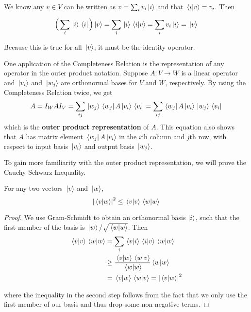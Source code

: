\begin{lproof}
We know any $v \in V$ can be written as $v = \sum_{i} v_{i} \ket*{i}$ and that $\bra*{i} \ket*{v} = v_{i}$. Then 

$$\Big( \sum_{i} \ket*{i} \bra*{i} \Big) \ket*{v} = \sum_{i} \ket*{i} \bra*{i} \ket*{v} = \sum_{i} v_{i} \ket*{i} = \ket*{v}$$

Because this is true for all $\ket*{v}$, it must be the identity operator. 
\end{lproof}

One application of the Completeness Relation is the representation of any operator in the outer product notation. Suppose $A: V \rightarrow W$ is a linear operator and $\ket*{v_{i}}$ and $\ket*{w_{j}}$ are orthonormal bases for $V$ and $W$, respectively. By using the Completeness Relation twice, we get
$$A = I_{W} A I_{V} = \sum_{ij} \ket*{w_{j}} \bra*{w_{j}} A \ket*{v_{i}} \bra*{v_{i}} = \sum_{ij} \bra*{w_{j}} A \ket*{v_{i}} \ket*{w_{j}} \bra*{v_{i}}$$
which is the \textbf{outer product representation} of $A$. This equation also shows that $A$ has matrix element $\bra*{w_{j}}A\ket*{v_{i}}$ in the $i$th column and $j$th row, with respect to input basis $\ket*{v_{i}}$ and output basis $\ket*{w_{j}}$.

To gain more familiarity with the outer product representation, we will prove the Cauchy-Schwarz Inequality. 

\begin{theorem}
For any two vectors $\ket*{v}$ and $\ket*{w}$, $$\abs{\bra*{v}\ket*{w}}^{2} \leq \bra*{v}\ket*{v} \bra*{w}\ket*{w}$$
\end{theorem}

\begin{proof}
We use Gram-Schmidt to obtain an orthonormal basis $\ket{i}$, such that the first member of the basis is $\ket*{w} / \sqrt{\bra*{w}\ket*{w}}$. Then 
$$
\begin{aligned} 
\bra*{v}\ket*{v} \bra*{w}\ket*{w} &= \sum_{i} \bra*{v}\ket*{i} \bra*{i}\ket*{v} \bra*{w}\ket*{w} \\
&\geq \frac{\bra*{v}\ket*{w} \bra*{w}\ket*{v}}{\bra*{w}\ket*{w}} \bra*{w}\ket*{w} \\ 
&= \bra*{v}\ket*{w} \bra*{w}\ket*{v} = \abs{\bra*{v}\ket*{w}}^{2}
\end{aligned}
$$

where the inequality in the second step follows from the fact that we only use the first member of our basis and thus drop some non-negative terms.
\end{proof}

